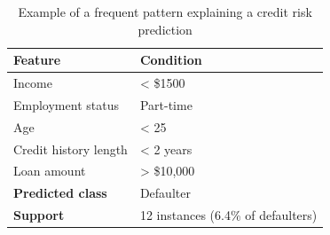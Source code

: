 \begin{table}[h]
\centering
\caption{Example of a frequent pattern explaining a credit risk prediction}
\label{tab:example_pattern}
\begin{tabular}{|l|l|}
\hline
\textbf{Feature} & \textbf{Condition} \\
\hline
Income & < \$1500 \\
Employment status & Part-time \\
Age & < 25 \\
Credit history length & < 2 years \\
Loan amount & > \$10,000 \\
\hline
\textbf{Predicted class} & Defaulter \\
\hline
\textbf{Support} & 12 instances (6.4\% of defaulters) \\
\hline
\end{tabular}
\end{table}
